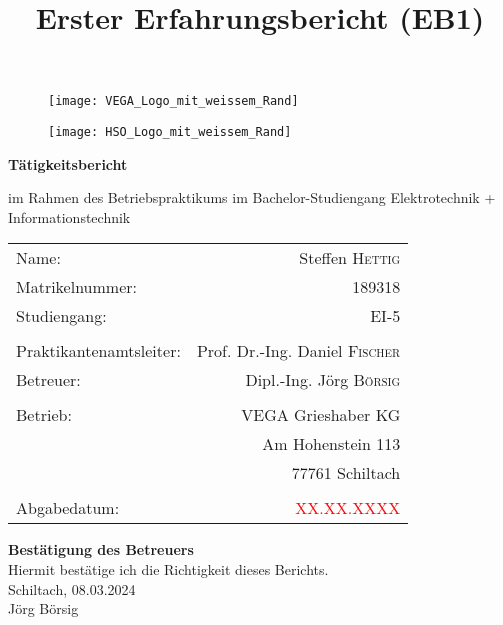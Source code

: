 \documentclass[
	letterpaper, %
	10pt, %
]{CSUniSchoolLabReport}
\title{Erster Erfahrungsbericht (EB1)}
\date{}
\begin{document}
\thispagestyle{empty}
\begin{spacing}{1.6}
\begin{center}

\begin{figure}[H]
\begin{minipage}[t]{0.5\textwidth}
    \texttt{[image: VEGA\_Logo\_mit\_weissem\_Rand]}
\end{minipage}
\begin{minipage}[t]{0.5\textwidth}
    \texttt{[image: HSO\_Logo\_mit\_weissem\_Rand]}
\end{minipage}

\end{figure}
\Huge \textbf{Tätigkeitsbericht}

\Large
im Rahmen des Betriebspraktikums im Bachelor-Studiengang Elektrotechnik + Informationstechnik



\Large 
\begin{tabular}{l r}\\
Name:& Steffen \textsc{Hettig}\\
Matrikelnummer: & 189318 \\
Studiengang: & EI-5\\
\\
Praktikantenamtsleiter: &  \qquad Prof. Dr.-Ing. Daniel \textsc{Fischer}\\
Betreuer: &  \qquad Dipl.-Ing. Jörg \textsc{Börsig}\\
\\
Betrieb: & VEGA Grieshaber KG\\
& Am Hohenstein 113\\
& 77761 Schiltach\\
\\
Abgabedatum: & \textcolor{red}{XX.XX.XXXX}\\
\end{tabular}
\end{center}

\newpage
\ofoot{ }
\Large
\textbf{Bestätigung des Betreuers}\\
\linebreak
\large
Hiermit bestätige ich die Richtigkeit dieses Berichts.\\
\linebreak
\linebreak
\linebreak
Schiltach, 08.03.2024\\
\linebreak
\linebreak
Jörg Börsig



\end{spacing}
\end{document}
